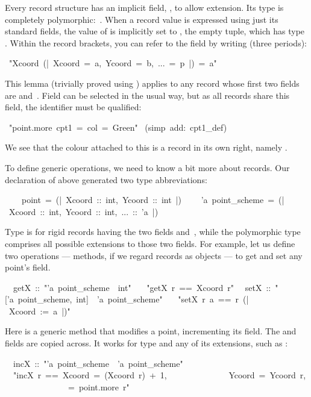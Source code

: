 Every record structure has an implicit field, , to allow
extension.  Its type is completely polymorphic:~.  When a
record value is expressed using just its standard fields, the value of
 is implicitly set to \isa{()}, the empty tuple, which has
type .  Within the record brackets, you can refer to the
 field by writing  (three periods):
\begin{isabelle}
\ "Xcoord\ (|\ Xcoord\ =\ a,\ Ycoord\ =\ b,\ ...\ =\ p\ |)\ =\ a"
\end{isabelle}
This lemma (trivially proved using ) applies to any
record whose first two fields are  and~.  Field
 can be selected in the usual way, but as all records share
this field, the identifier must be qualified:
\begin{isabelle}
\ "point.more\ cpt1\ =\ \isasymlparr col\ =\ Green\isasymrparr "\isanewline
{}\ (simp\ add:\ cpt1_def)
\end{isabelle}
%
We see that the colour attached to this  is a record in its
own right, namely 
.

To define generic operations, we need to know a bit more about records.
Our declaration of  above generated two type
abbreviations:
\begin{isabelle}
\ \ \ \ point\ =\ (|\ Xcoord\ ::\ int,\ Ycoord\ ::\ int\ |)\isanewline
\ \ \ \ 'a\ point_scheme\ =\ (|\ Xcoord\ ::\ int,\ Ycoord\ ::\ int,\ ...\ ::\ 'a\ |)
\end{isabelle}
%
Type  is for rigid records having the two fields
 and~, while the polymorphic type 
comprises all possible extensions to those two fields.  For example,
let us define two operations --- methods, if we regard records as
objects --- to get and set any point's
 field. 
\begin{isabelle}
\ \ getX\ ::\ "'a\ point_scheme\ \isasymRightarrow \ int"\isanewline
\ \ \ "getX\ r\ ==\ Xcoord\ r"\isanewline
\ \ setX\ ::\ "['a\ point_scheme,\ int]\ \isasymRightarrow \ 'a\ point_scheme"\isanewline
\ \ \ "setX\ r\ a\ ==\ r\ (|\ Xcoord\ :=\ a\ |)"
\end{isabelle}

Here is a generic method that modifies a point, incrementing its
 field.  The  and  fields
are copied across.  It works for type  and any of its
extensions, such as :
\begin{isabelle}
\isanewline
\ \ incX\ ::\ "'a\ point_scheme\ \isasymRightarrow \ 'a\ point_scheme"\isanewline
\ \ "incX\ r\ ==\ \isasymlparr Xcoord\ =\ (Xcoord\ r)\ +\ 1,\isanewline
\ \ \ \ \ \ \ \ \ \ \ \ \ \ Ycoord\ =\ Ycoord\ r,\isanewline
\ \ \ \ \ \ \ \ \ \ \ \ \ \ \isasymdots \ =\ point.more\
r\isasymrparr"
\end{isabelle}

